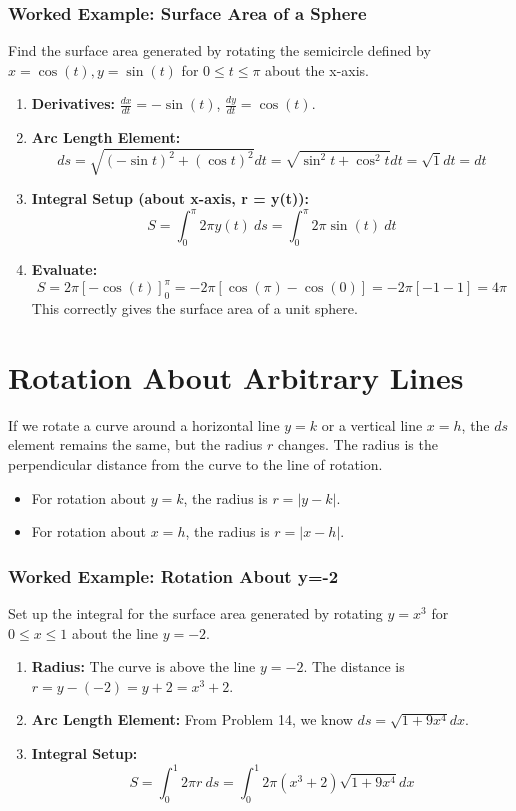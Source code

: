 \documentclass{article}
\begin{document}
\subsubsection{Worked Example: Surface Area of a Sphere}
Find the surface area generated by rotating the semicircle defined by \(x=\cos(t), y=\sin(t)\) for \(0 \le t \le \pi\) about the x-axis.
\begin{enumerate}
    \item \textbf{Derivatives:} \(\frac{dx}{dt} = -\sin(t)\), \(\frac{dy}{dt} = \cos(t)\).
    \item \textbf{Arc Length Element:}
    \[ ds = \sqrt{(-\sin t)^2 + (\cos t)^2} dt = \sqrt{\sin^2 t + \cos^2 t} dt = \sqrt{1} dt = dt \]
    \item \textbf{Integral Setup (about x-axis, r = y(t)):}
    \[ S = \int_{0}^{\pi} 2\pi y(t) \ ds = \int_{0}^{\pi} 2\pi \sin(t) \ dt \]
    \item \textbf{Evaluate:}
    \[ S = 2\pi [-\cos(t)]_{0}^{\pi} = -2\pi[\cos(\pi) - \cos(0)] = -2\pi[-1 - 1] = 4\pi \]
    This correctly gives the surface area of a unit sphere.
\end{enumerate}

\section{Rotation About Arbitrary Lines}
If we rotate a curve around a horizontal line \(y=k\) or a vertical line \(x=h\), the \(ds\) element remains the same, but the radius \(r\) changes. The radius is the perpendicular distance from the curve to the line of rotation.
\begin{itemize}
    \item For rotation about \(y=k\), the radius is \(r = |y-k|\).
    \item For rotation about \(x=h\), the radius is \(r = |x-h|\).
\end{itemize}
\subsubsection{Worked Example: Rotation About y=-2}
Set up the integral for the surface area generated by rotating \(y=x^3\) for \(0 \le x \le 1\) about the line \(y=-2\).
\begin{enumerate}
    \item \textbf{Radius:} The curve is above the line \(y=-2\). The distance is \(r = y - (-2) = y+2 = x^3+2\).
    \item \textbf{Arc Length Element:} From Problem 14, we know \(ds = \sqrt{1+9x^4}dx\).
    \item \textbf{Integral Setup:}
    \[ S = \int_{0}^{1} 2\pi r \ ds = \int_{0}^{1} 2\pi (x^3+2) \sqrt{1+9x^4} dx \]
\end{enumerate}
\end{document}
